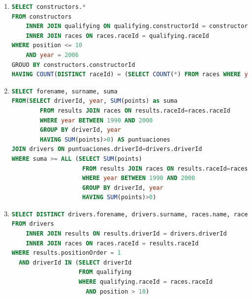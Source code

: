 \documentclass{db-practice}
\begin{document}
\begin{enumerate}
\item
\begin{lstlisting}[language=SQL]
SELECT constructors.*
FROM constructors 
    INNER JOIN qualifying ON qualifying.constructorId = constructors.constructorId
    INNER JOIN races ON races.raceId = qualifying.raceId
WHERE position <= 10
    AND year = 2006
GROUO BY constructors.constructorId
HAVING COUNT(DISTINCT raceId) = (SELECT COUNT(*) FROM races WHERE year = 2006);
\end{lstlisting}

\item
\begin{lstlisting}[language=SQL]
SELECT forename, surname, suma
FROM(SELECT driverId, year, SUM(points) as suma
        FROM results JOIN races ON results.raceId=races.raceId
        WHERE year BETWEEN 1990 AND 2000
        GROUP BY driverId, year
        HAVING SUM(points)>0) AS puntuaciones
JOIN drivers ON puntuaciones.driverId=drivers.driverId
WHERE suma >= ALL (SELECT SUM(points)
                    FROM results JOIN races ON results.raceId=races.raceId
                    WHERE year BETWEEN 1990 AND 2000
                    GROUP BY driverId, year
                    HAVING SUM(points)>0)
\end{lstlisting}

\item
\begin{lstlisting}[language=SQL]
SELECT DISTINCT drivers.forename, drivers.surname, races.name, races.year
FROM drivers
    INNER JOIN results ON results.driverId = drivers.driverId
    INNER JOIN races ON races.raceId = results.raceId
WHERE results.positionOrder = 1
  AND driverId IN (SELECT driverId
                   FROM qualifying
                   WHERE qualifying.raceId = races.raceId
                     AND position > 10)
\end{lstlisting}


\end{enumerate}
\end{document}
